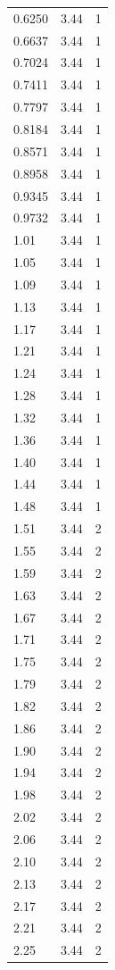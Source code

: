 \begin{longtable}{lrr}
  0.6250 & 3.44 & 1 \\
  0.6637 & 3.44 & 1 \\
  0.7024 & 3.44 & 1 \\
  0.7411 & 3.44 & 1 \\
  0.7797 & 3.44 & 1 \\
  0.8184 & 3.44 & 1 \\
  0.8571 & 3.44 & 1 \\
  0.8958 & 3.44 & 1 \\
  0.9345 & 3.44 & 1 \\
  0.9732 & 3.44 & 1 \\
  1.01 & 3.44 & 1 \\
  1.05 & 3.44 & 1 \\
  1.09 & 3.44 & 1 \\
  1.13 & 3.44 & 1 \\
  1.17 & 3.44 & 1 \\
  1.21 & 3.44 & 1 \\
  1.24 & 3.44 & 1 \\
  1.28 & 3.44 & 1 \\
  1.32 & 3.44 & 1 \\
  1.36 & 3.44 & 1 \\
  1.40 & 3.44 & 1 \\
  1.44 & 3.44 & 1 \\
  1.48 & 3.44 & 1 \\
  1.51 & 3.44 & 2 \\
  1.55 & 3.44 & 2 \\
  1.59 & 3.44 & 2 \\
  1.63 & 3.44 & 2 \\
  1.67 & 3.44 & 2 \\
  1.71 & 3.44 & 2 \\
  1.75 & 3.44 & 2 \\
  1.79 & 3.44 & 2 \\
  1.82 & 3.44 & 2 \\
  1.86 & 3.44 & 2 \\
  1.90 & 3.44 & 2 \\
  1.94 & 3.44 & 2 \\
  1.98 & 3.44 & 2 \\
  2.02 & 3.44 & 2 \\
  2.06 & 3.44 & 2 \\
  2.10 & 3.44 & 2 \\
  2.13 & 3.44 & 2 \\
  2.17 & 3.44 & 2 \\
  2.21 & 3.44 & 2 \\
  2.25 & 3.44 & 2 \\

\end{longtable}
